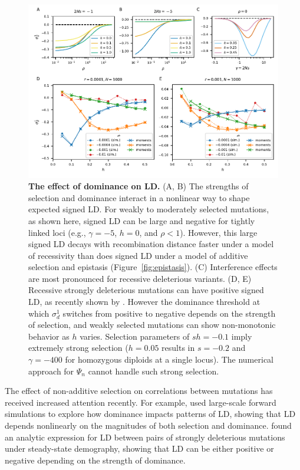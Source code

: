 \documentclass[]{article}
\begin{document}
\begin{figure}[tb!]
    \centering
    \includegraphics{../figures/dominance_roze}
    \caption{
        \textbf{The effect of dominance on LD.}
        (A, B) The strengths of selection and dominance interact in a nonlinear way
        to shape expected signed LD. For weakly to moderately selected mutations,
        as shown here, signed LD can be large and negative for tightly linked loci
        (e.g., \(\gamma=-5\), \(h=0\), and \(\rho < 1\)). However, this large signed
        LD decays with recombination distance faster under a model of recessivity
        than does signed LD under a model of additive selection and
        epistasis (Figure~\ref{fig:epistasis}).
        (C) Interference effects are most pronounced for recessive deleterious
        variants.
        (D, E) Recessive strongly deleterious mutations can have positive signed
        LD, as recently shown by \citet{Roze2021-cf}.
        However the dominance threshold at which \(\sigma_d^1\) switches from
        positive to negative depends on the strength of selection, and weakly
        selected mutations can show non-monotonic behavior as $h$ varies.
        Selection parameters of \(sh=-0.1\) imply extremely strong selection
        (\(h=0.05\) results in \(s=-0.2\) and \(\gamma=-400\) for homozygous
        diploids at a single locus). The numerical approach for \(\Psi_n\)
        cannot handle such strong selection.
    }
    \label{fig:dominance}
\end{figure}

The effect of non-additive selection on correlations between mutations has
received increased attention recently. For example, \citet{Garcia2021-zn} used
large-scale forward simulations to explore how dominance impacts patterns of
LD, showing that LD depends nonlinearly on the magnitudes of both selection
and dominance. \citet{Roze2021-cf} found an analytic expression
for LD between pairs of strongly deleterious mutations under steady-state
demography, showing that LD can be either positive or negative depending on the
strength of dominance.
\end{document}
